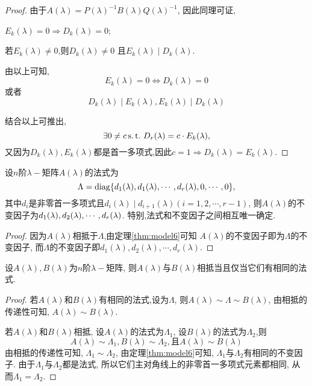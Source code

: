\begin{proof}
  由于$A(\lambda)=P(\lambda)^{-1}B(\lambda)Q(\lambda)^{-1}$,
  因此同理可证,
  \begin{asparaenum}[$1^{\circ}.$]
  \item $E_k(\lambda)=0 \Longrightarrow D_k(\lambda)=0$;
  \item 若$E_k(\lambda) \neq 0$,则$D_k(\lambda) \neq 0$
    且$E_k(\lambda)\mid D_k(\lambda)$.
  \end{asparaenum}

  由以上可知,
  \[E_k(\lambda)=0 \Longleftrightarrow D_k(\lambda)=0\]
  或者
  \[D_k(\lambda)\mid E_k(\lambda), E_k(\lambda)\mid D_k(\lambda)\]

  结合以上可推出,
  \[\exists 0 \neq c \operatorname{s.t.{}} D_r(\lambda)=c\cdot E_k(\lambda),\]
  又因为$D_k(\lambda),E_k(\lambda)$都是首一多项式,因此$c=1 \Longrightarrow D_k(\lambda)=E_k(\lambda)$.
\end{proof}
\begin{deduction}\label{ddn:model1}
  设$n$阶$\lambda-$矩阵$A(\lambda)$的法式为
  \[\Lambda=\operatorname{diag}\{d_1(\lambda),d_1(\lambda),\cdots,d_r(\lambda),0,\cdots,0\},\]
  其中$d_i$是非零首一多项式且$d_i(\lambda)\mid d_{i+1}(\lambda)(i=1,2,\cdots,r-1)$,
  则$A(\lambda)$的不变因子为$d_1(\lambda),\\d_2(\lambda),\cdots,d_r(\lambda)$.
  特别,法式和不变因子之间相互唯一确定.
\end{deduction}
\begin{proof}
  因为$A(\lambda)$相抵于$\Lambda$,由定理\ref{thm:model6}可知
  $A(\lambda)$的不变因子即为$\Lambda$的不变因子,
  而$\Lambda$的不变因子即$d_1(\lambda),d_2(\lambda),\cdots,d_r(\lambda)$.
\end{proof}
\begin{deduction}\label{ddn:model2}
  设$A(\lambda),B(\lambda)$为$n$阶$\lambda-$矩阵,
  则$A(\lambda)$与$B(\lambda)$相抵当且仅当它们有相同的法式.
\end{deduction}
\begin{proof}
  若$A(\lambda)$和$B(\lambda)$有相同的法式,设为$\Lambda$,
  则$A(\lambda)\sim \Lambda \sim B(\lambda)$,
  由相抵的传递性可知, $A(\lambda)\sim B(\lambda)$.

  若$A(\lambda)$和$B(\lambda)$相抵,
  设$A(\lambda)$的法式为$\Lambda_1$,
  设$B(\lambda)$的法式为$\Lambda_2$,则
  \[A(\lambda)\sim \Lambda_1,B(\lambda)\sim \Lambda_2,
    \text{且}A(\lambda)\sim B(\lambda)\]
  由相抵的传递性可知, $\Lambda_1\sim \Lambda_2$,
  由定理\ref{thm:model6}可知,
  $\Lambda_1$与$\Lambda_2$有相同的不变因子.
  由于$\Lambda_1$与$\Lambda_2$都是法式,
  所以它们主对角线上的非零首一多项式元素都相同,
  从而$\Lambda_1=\Lambda_2$.
\end{proof}


